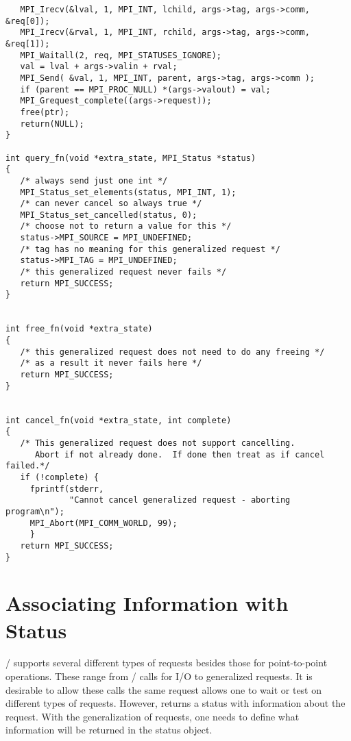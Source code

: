 \begin{example}
{\begin{verbatim}
   MPI_Irecv(&lval, 1, MPI_INT, lchild, args->tag, args->comm, &req[0]);
   MPI_Irecv(&rval, 1, MPI_INT, rchild, args->tag, args->comm, &req[1]);
   MPI_Waitall(2, req, MPI_STATUSES_IGNORE);
   val = lval + args->valin + rval;
   MPI_Send( &val, 1, MPI_INT, parent, args->tag, args->comm );
   if (parent == MPI_PROC_NULL) *(args->valout) = val;
   MPI_Grequest_complete((args->request));   
   free(ptr);
   return(NULL);
}

int query_fn(void *extra_state, MPI_Status *status)
{
   /* always send just one int */
   MPI_Status_set_elements(status, MPI_INT, 1);
   /* can never cancel so always true */
   MPI_Status_set_cancelled(status, 0);
   /* choose not to return a value for this */
   status->MPI_SOURCE = MPI_UNDEFINED;
   /* tag has no meaning for this generalized request */
   status->MPI_TAG = MPI_UNDEFINED;
   /* this generalized request never fails */
   return MPI_SUCCESS;
}


int free_fn(void *extra_state)
{
   /* this generalized request does not need to do any freeing */
   /* as a result it never fails here */
   return MPI_SUCCESS;
}


int cancel_fn(void *extra_state, int complete)
{
   /* This generalized request does not support cancelling.
      Abort if not already done.  If done then treat as if cancel failed.*/
   if (!complete) {
     fprintf(stderr,
             "Cannot cancel generalized request - aborting program\n");
     MPI_Abort(MPI_COMM_WORLD, 99);
     }
   return MPI_SUCCESS;
}
\end{verbatim}
}
\end{example}

\section{Associating Information with Status}
\label{sec:ei-status}

\MPI/ supports several different types of requests besides those for
point-to-point operations.
These range from 
\mpi/ calls for I/O to generalized requests.  It is desirable to allow
these calls  the same request  allows one to
wait or test on different types of requests.  However,
%
%
%
%
%
%
 returns a status
with information about the request.  With the generalization of
requests, one needs to define what information will be returned in the
status object.

